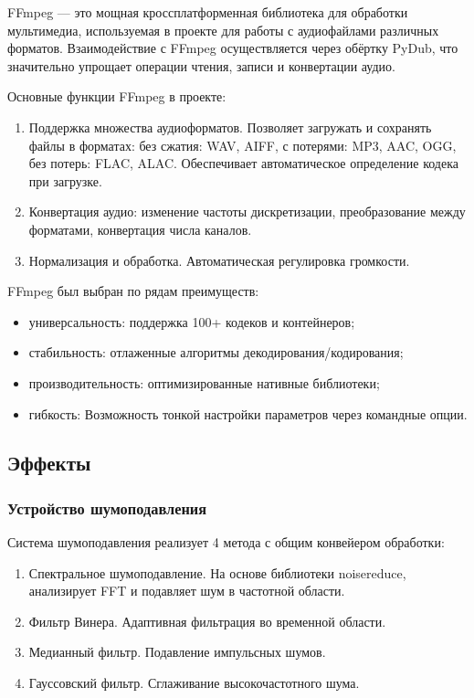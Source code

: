 FFmpeg — это мощная кроссплатформенная библиотека для обработки мультимедиа, используемая в проекте для работы с аудиофайлами различных форматов. Взаимодействие с FFmpeg осуществляется через обёртку PyDub, что значительно упрощает операции чтения, записи и конвертации аудио.

Основные функции FFmpeg в проекте:
\begin{enumerate}
	\item Поддержка множества аудиоформатов. Позволяет загружать и сохранять файлы в форматах: без сжатия: WAV, AIFF, с потерями: MP3, AAC, OGG, без потерь: FLAC, ALAC. Обеспечивает автоматическое определение кодека при загрузке.
	\item Конвертация аудио: изменение частоты дискретизации, преобразование между форматами, конвертация числа каналов.
	\item Нормализация и обработка. Автоматическая регулировка громкости.
\end{enumerate}

FFmpeg был выбран по рядам преимуществ:
\begin{itemize}
	\item универсальность: поддержка 100+ кодеков и контейнеров;
	\item стабильность: отлаженные алгоритмы декодирования/кодирования;
	\item производительность: оптимизированные нативные библиотеки;
	\item гибкость: Возможность тонкой настройки параметров через командные опции.
\end{itemize}

\subsection{Эффекты}

\subsubsection{Устройство шумоподавления}

Система шумоподавления реализует 4 метода с общим конвейером обработки:
\begin{enumerate}
	\item Спектральное шумоподавление. На основе библиотеки noisereduce, анализирует FFT и подавляет шум в частотной области.
	\item Фильтр Винера. Адаптивная фильтрация во временной области.
	\item Медианный фильтр. Подавление импульсных шумов.
	\item Гауссовский фильтр. Сглаживание высокочастотного шума.
\end{enumerate}

